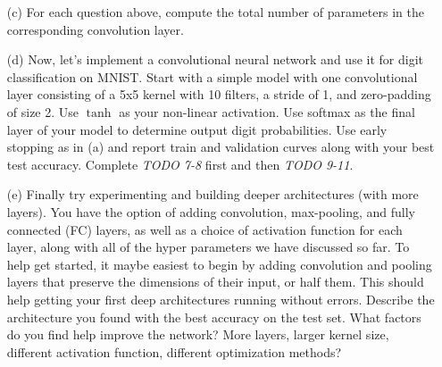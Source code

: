 \documentclass[10pt]{report}
\begin{document}
\begin{enumerate}
\begin{enumerate}
\item[(c)] For each question above, compute the total number of parameters in the corresponding convolution layer. 

\item[(d)] Now, let's implement a convolutional neural network and use it for digit classification on MNIST. Start with a simple model with one convolutional layer consisting of a 5x5 kernel with 10 filters, a stride of 1, and zero-padding of size 2. Use $\tanh$ as your non-linear activation. Use softmax as the final layer of your model to determine output digit probabilities. Use early stopping as in (a) and report train and validation curves along with your best test accuracy. Complete \textit{TODO 7-8} first and then \textit{TODO 9-11}.

\item[(e)] Finally try experimenting and building deeper architectures (with more layers). You have the option of adding convolution, max-pooling, and fully connected (FC) layers, as well as a choice of activation function for each layer, along with all of the hyper parameters we have discussed so far. To help get started, it maybe easiest to begin by adding convolution and pooling layers that preserve the dimensions of their input, or half them. This should help getting your first deep architectures running without errors. Describe the architecture you found with the best accuracy on the test set. What factors do you find help improve the network? More layers, larger kernel size, different activation function, different optimization methods?

\end{enumerate}
\begin{solution}
\end{solution}

\end{enumerate}
\end{document}
